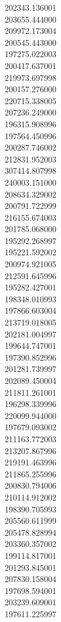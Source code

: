 202343.136001\\
203655.444000\\
209972.173004\\
200545.443000\\
197275.022003\\
200417.637001\\
219973.697998\\
200157.276000\\
220715.338005\\
207236.249000\\
196315.908996\\
197564.450996\\
200287.746002\\
212831.952003\\
307414.807998\\
240003.151000\\
208634.329002\\
200791.722999\\
216155.674003\\
201785.068000\\
195292.268997\\
195221.592002\\
200974.921005\\
212591.645996\\
195282.427001\\
198348.010993\\
197866.603004\\
213719.018005\\
202181.004997\\
199644.747001\\
197390.852996\\
201281.739997\\
202089.450004\\
211811.261001\\
196298.339996\\
220099.944000\\
197679.093002\\
211163.772003\\
213207.867996\\
219191.463996\\
211865.255996\\
200830.794006\\
210114.912002\\
198390.705993\\
205560.611999\\
205478.828994\\
203360.357002\\
199114.817001\\
201293.845001\\
207830.158004\\
197698.594001\\
203239.609001\\
197611.225997\\
